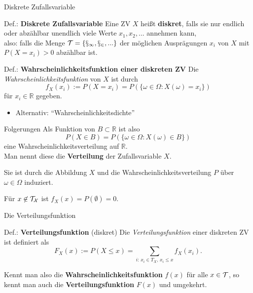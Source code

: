 \documentclass[
  10pt,
  ignorenonframetext,
]{beamer}
\providecommand{\tightlist}{%
  \setlength{\itemsep}{0pt}\setlength{\parskip}{0pt}}
\begin{document}
\begin{frame}{Diskrete Zufallsvariable}
\protect\hypertarget{diskrete-zufallsvariable}{}
\begin{block}{Def.: \textbf{Diskrete Zufallsvariable}}
\protect\hypertarget{def.-diskrete-zufallsvariable}{}
Eine ZV \(X\) heißt \textbf{diskret}, falls sie nur endlich oder
abzählbar unendlich viele Werte \(x_1, x_2, ...\) annehmen kann,\\
also: falls die Menge \(\cal{T}=\{x_1, x_2, ...\}\) der möglichen
Ausprägungen \(x_i\) von \(X\) mit \(P(X = x_i) > 0\) abzählbar ist.
\end{block}

\begin{block}{Def.: \textbf{Wahrscheinlichkeitsfunktion einer diskreten
ZV}}
\protect\hypertarget{def.-wahrscheinlichkeitsfunktion-einer-diskreten-zv}{}
Die \emph{Wahrscheinlichkeitsfunktion} von \(X\) ist durch
\[f_X(x_i) := P(X = x_i) = P\left(\{\omega \in \Omega: X(\omega) = x_i\}\right)\]
für \(x_i \in \mathbb{R}\) gegeben.
\end{block}

\begin{itemize}
\tightlist
\item
  Alternativ: ``Wahrscheinlichkeitsdichte''
\end{itemize}

\end{frame}

\begin{frame}{Folgerungen}
\protect\hypertarget{folgerungen-1}{}
Als Funktion von \(B \subset \mathbb{R}\) ist also
\[P(X \in B) = P(\{\omega \in \Omega: X(\omega) \in B\})\] eine
Wahrscheinlichkeitsverteilung auf \(\mathbb{R}\).\\
Man nennt diese die \textbf{Verteilung} der Zufallsvariable \(X\).

Sie ist durch die Abbildung \(X\) und die Wahrscheinlichkeitsverteilung
\(P\) über \(\omega \in \Omega\) induziert.

\hfill\break

Für \(x \not \in {\cal{T}_X}\) ist \(f_X(x) = P(\emptyset) = 0\).
\end{frame}

\begin{frame}{Die Verteilungsfunktion}
\protect\hypertarget{die-verteilungsfunktion}{}
\begin{block}{Def.: \textbf{Verteilungsfunktion} (diskret)}
\protect\hypertarget{def.-verteilungsfunktion-diskret}{}
Die \emph{Verteilungsfunktion} einer diskreten ZV ist definiert als
\[F_X(x) := P(X \leq x) = \sum_{i:\, x_i \in T_X,\, x_i \leq x} f_X(x_i).\]
\end{block}

Kennt man also die \textbf{Wahrscheinlichkeitsfunktion} \(f(x)\) für
alle \(x \in \cal{T}\), so kennt man auch die
\textbf{Verteilungsfunktion} \(F(x)\) und umgekehrt.

\end{frame}
\end{document}
